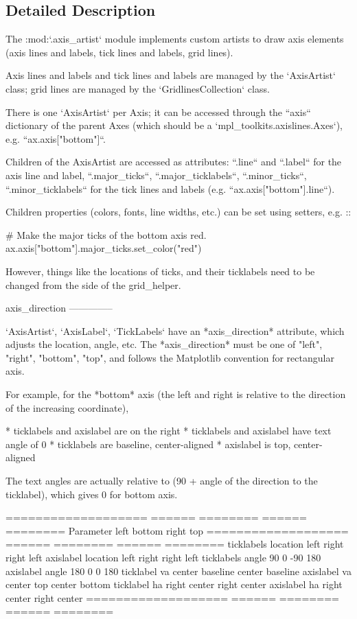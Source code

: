 \subsection{Detailed Description}
\begin{DoxyVerb}The :mod:`.axis_artist` module implements custom artists to draw axis elements
(axis lines and labels, tick lines and labels, grid lines).

Axis lines and labels and tick lines and labels are managed by the `AxisArtist`
class; grid lines are managed by the `GridlinesCollection` class.

There is one `AxisArtist` per Axis; it can be accessed through
the ``axis`` dictionary of the parent Axes (which should be a
`mpl_toolkits.axislines.Axes`), e.g. ``ax.axis["bottom"]``.

Children of the AxisArtist are accessed as attributes: ``.line`` and ``.label``
for the axis line and label, ``.major_ticks``, ``.major_ticklabels``,
``.minor_ticks``, ``.minor_ticklabels`` for the tick lines and labels (e.g.
``ax.axis["bottom"].line``).

Children properties (colors, fonts, line widths, etc.) can be set using
setters, e.g. ::

  # Make the major ticks of the bottom axis red.
  ax.axis["bottom"].major_ticks.set_color("red")

However, things like the locations of ticks, and their ticklabels need to be
changed from the side of the grid_helper.

axis_direction
--------------

`AxisArtist`, `AxisLabel`, `TickLabels` have an *axis_direction* attribute,
which adjusts the location, angle, etc. The *axis_direction* must be one of
"left", "right", "bottom", "top", and follows the Matplotlib convention for
rectangular axis.

For example, for the *bottom* axis (the left and right is relative to the
direction of the increasing coordinate),

* ticklabels and axislabel are on the right
* ticklabels and axislabel have text angle of 0
* ticklabels are baseline, center-aligned
* axislabel is top, center-aligned

The text angles are actually relative to (90 + angle of the direction to the
ticklabel), which gives 0 for bottom axis.

=================== ====== ======== ====== ========
Parameter           left   bottom   right  top
=================== ====== ======== ====== ========
ticklabels location left   right    right  left
axislabel location  left   right    right  left
ticklabels angle    90     0        -90    180
axislabel angle     180    0        0      180
ticklabel va        center baseline center baseline
axislabel va        center top      center bottom
ticklabel ha        right  center   right  center
axislabel ha        right  center   right  center
=================== ====== ======== ====== ========


\end{DoxyVerb}
